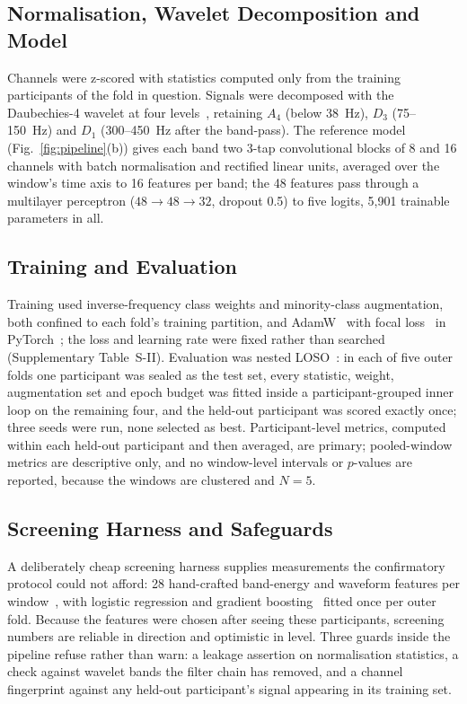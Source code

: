 \documentclass[journal]{IEEEtran}
\begin{document}
\subsection{Normalisation, Wavelet Decomposition and Model}

Channels were z-scored with statistics computed only from the training participants of the fold in question. Signals were decomposed with the Daubechies-4 wavelet at four levels~\cite{daubechies1992ten,englehart2003robust}, retaining $A_4$ (below 38~Hz), $D_3$ (75--150~Hz) and $D_1$ (300--450~Hz after the band-pass). The reference model (Fig.~\ref{fig:pipeline}(b)) gives each band two 3-tap convolutional blocks of 8 and 16 channels with batch normalisation and rectified linear units, averaged over the window's time axis to 16 features per band; the 48 features pass through a multilayer perceptron ($48\rightarrow48\rightarrow32$, dropout 0.5) to five logits, 5,901 trainable parameters in all.

\subsection{Training and Evaluation}
\label{sec:training}

Training used inverse-frequency class weights and minority-class augmentation, both confined to each fold's training partition, and AdamW~\cite{loshchilov2019decoupled} with focal loss~\cite{lin2017focal} in PyTorch~\cite{paszke2019pytorch}; the loss and learning rate were fixed rather than searched (Supplementary Table~S-II). Evaluation was nested LOSO~\cite{cawley2010overfitting,varma2006bias}: in each of five outer folds one participant was sealed as the test set, every statistic, weight, augmentation set and epoch budget was fitted inside a participant-grouped inner loop on the remaining four, and the held-out participant was scored exactly once; three seeds were run, none selected as best. Participant-level metrics, computed within each held-out participant and then averaged, are primary; pooled-window metrics are descriptive only, and no window-level intervals or $p$-values are reported, because the windows are clustered and $N=5$.

\subsection{Screening Harness and Safeguards}
\label{sec:screening}

A deliberately cheap screening harness supplies measurements the confirmatory protocol could not afford: 28 hand-crafted band-energy and waveform features per window~\cite{phinyomark2012feature}, with logistic regression and gradient boosting~\cite{pedregosa2011scikit} fitted once per outer fold. Because the features were chosen after seeing these participants, screening numbers are reliable in direction and optimistic in level. Three guards inside the pipeline refuse rather than warn: a leakage assertion on normalisation statistics, a check against wavelet bands the filter chain has removed, and a channel fingerprint against any held-out participant's signal appearing in its training set.
\end{document}
